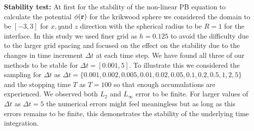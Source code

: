 \textbf{Stability test:} At first for the stability of the non-linear PB equation to calculate the potential $\phi(\bf r)$ for the krikwood sphere we considered the domain to be $[-3,3]$ for $x, y$and $z$ direction with the spherical radius to be $R = 1$ for the interface. In this study we used finer grid as $h = 0.125$ to avoid the difficulty due to the larger grid spacing and focused on the effect on the stability due to the changes in time increment $\Delta t$ at each time step. We have found all three of our methods to be stable for $\Delta t  =[0.001,5]$. To illustrate this we considered the sampling for $\Delta t $ as $\Delta t =\{0.001, 0.002, 0.005,0.01, 0.02, 0.05, 0.1, 0.2, 0.5, 1,2,5\}$ and the stopping time $T$ as $T =100$  so that enough accumulations are experienced. We observed both $L_2$ and $L_\infty$ error to be finite. For larger values of $\Delta t$ as $\Delta t =5$ the numerical errors might feel meaningless but as long as this errors remains to be finite, this demonstrates the stability of the underlying time integration. 




